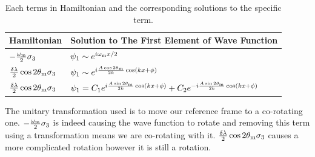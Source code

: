 \begin{table}
\centering
\setlength\tabcolsep{2pt}
\begin{tabular}{l|l}
\hline
 Hamiltonian &   Solution to The First Element of Wave Function \\
\hline
   $-\frac{\omega_\mathrm m}{2}\sigma_3$ &  $\psi_1 \sim e^{i\omega_\mathrm m x/2}$  \\
   $\frac{\delta\lambda}{2}\cos 2\theta_\mathrm m \sigma_3$     &   $\psi_1 \sim e^{i\frac{A\cos 2\theta_\mathrm m}{2k}\cos(kx+\phi)}$ \\
  $\frac{\delta\lambda}{2}\cos 2\theta_\mathrm m \sigma_3$     &   $\psi_1 = C_1 e^{i\frac{A\sin 2\theta_\mathrm m}{2k}\cos(kx+\phi)} + C_2 e^{-i\frac{A\sin 2\theta_\mathrm m}{2k}\cos(kx+\phi)}$ \\
\hline

\end{tabular}
\caption{\label{chap:matter-sec:deep-jacobi-subsec:single-matter-freq-tab:decomp-hamil}Each terms in Hamiltonian and the corresponding solutions to the specific term.}
\end{table}




The unitary transformation used is to move our reference frame to a co-rotating one. $-\frac{\omega_\mathrm m}{2}\sigma_3$ is indeed causing the wave function to rotate and removing this term using a transformation means we are co-rotating with it. $\frac{\delta\lambda}{2}\cos 2\theta_\mathrm m \sigma_3$ causes a more complicated rotation however it is still a rotation.

